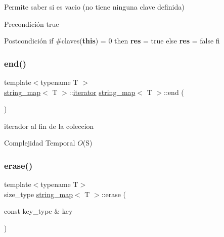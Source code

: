 Permite saber si es vacio (no tiene ninguna clave definida) 

\begin{DoxyPrecond}{Precondición}
true 
\end{DoxyPrecond}
\begin{DoxyPostcond}{Postcondición}
if \#claves({\bfseries this}) = 0 then {\bfseries res} = true else {\bfseries res} = false fi 
\end{DoxyPostcond}
\mbox{\label{classstring__map_ab063b2f78945d192c5ef3ccc68db8e80}} 
\subsubsection{\texorpdfstring{end()}{end()}}
{\footnotesize\ttfamily template$<$typename T $>$ \\
\mbox{\hyperlink{classstring__map}{string\+\_\+map}}$<$ T $>$\+::\mbox{\hyperlink{classstring__map_1_1iterator}{iterator}} \mbox{\hyperlink{classstring__map}{string\+\_\+map}}$<$ T $>$\+::end (\begin{DoxyParamCaption}{ }\end{DoxyParamCaption})}



iterador al fin de la coleccion 


\begin{DoxyDescription}
\item[Complejidad Temporal]$O$(S)
\end{DoxyDescription}\mbox{\label{classstring__map_a380bf45fbfd19efcda1f9579e5c8600c}} 
\subsubsection{\texorpdfstring{erase()}{erase()}\hspace{0.1cm}{\footnotesize\ttfamily [1/2]}}
{\footnotesize\ttfamily template$<$typename T$>$ \\
size\+\_\+type \mbox{\hyperlink{classstring__map}{string\+\_\+map}}$<$ T $>$\+::erase (\begin{DoxyParamCaption}\item[{const key\+\_\+type \&}]{key }\end{DoxyParamCaption})}



